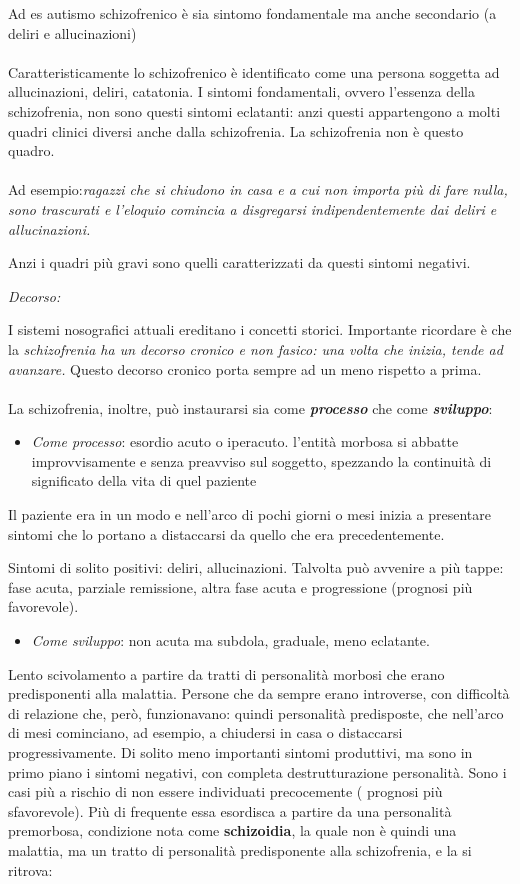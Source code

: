 Ad es autismo schizofrenico è sia sintomo fondamentale ma anche
secondario (a deliri e allucinazioni)
\\\\
Caratteristicamente lo schizofrenico è identificato come una persona
soggetta ad allucinazioni, deliri, catatonia. I sintomi fondamentali,
ovvero l'essenza della schizofrenia, non sono questi sintomi eclatanti:
anzi questi appartengono a molti quadri clinici diversi anche dalla
schizofrenia. La schizofrenia non è questo quadro.
\\\\
Ad esempio:\emph{ragazzi che si chiudono in casa e a cui non importa più
di fare nulla, sono trascurati e l'eloquio comincia a disgregarsi
indipendentemente dai deliri e allucinazioni.}

Anzi i quadri più gravi sono quelli caratterizzati da questi sintomi
negativi.

\emph{\emph{Decorso:}}

I sistemi nosografici attuali ereditano i concetti storici. Importante
ricordare è che la \emph{schizofrenia ha un decorso cronico e non
fasico: una volta che inizia, tende ad avanzare.} Questo decorso cronico
porta sempre ad un meno rispetto a prima.
\\\\
La schizofrenia, inoltre, può instaurarsi sia come
\textbf{\emph{processo}} che come \textbf{\emph{sviluppo}}:

\begin{itemize}
\item
  \emph{Come processo}: esordio acuto o iperacuto. l'entità morbosa si
  abbatte improvvisamente e senza preavviso sul soggetto, spezzando la
  continuità di significato della vita di quel paziente
\end{itemize}

Il paziente era in un modo e nell'arco di pochi giorni o mesi inizia a
presentare sintomi che lo portano a distaccarsi da quello che era
precedentemente.

Sintomi di solito positivi: deliri, allucinazioni. Talvolta può avvenire
a più tappe: fase acuta, parziale remissione, altra fase acuta e
progressione (prognosi più favorevole).

\begin{itemize}
\item
  \emph{Come sviluppo}: non acuta ma subdola, graduale, meno eclatante.
\end{itemize}

Lento scivolamento a partire da tratti di personalità morbosi che erano
predisponenti alla malattia. Persone che da sempre erano introverse, con
difficoltà di relazione che, però, funzionavano: quindi personalità
predisposte, che nell'arco di mesi cominciano, ad esempio, a chiudersi
in casa o distaccarsi progressivamente. Di solito meno importanti
sintomi produttivi, ma sono in primo piano i sintomi negativi, con
completa destrutturazione personalità. Sono i casi più a rischio di non
essere individuati precocemente ( prognosi più sfavorevole). Più di
frequente essa esordisca a partire da una personalità premorbosa,
condizione nota come \textbf{schizoidia}, la quale non è quindi una
malattia, ma un tratto di personalità predisponente alla schizofrenia, e
la si ritrova:

